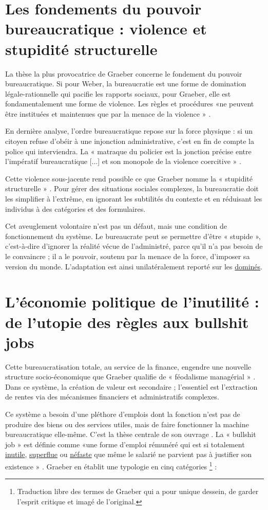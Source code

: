\section{Les fondements du pouvoir bureaucratique : violence et stupidité structurelle}

La thèse la plus provocatrice de Graeber concerne le fondement du pouvoir bureaucratique. Si pour Weber, la bureaucratie est une forme de domination légale-rationnelle qui pacifie les rapports sociaux, pour Graeber, elle est fondamentalement une forme de violence. Les règles et procédures «ne peuvent être instituées et maintenues que par la menace de la violence » .

En dernière analyse, l'ordre bureaucratique repose sur la force physique : si un citoyen refuse d'obéir à une injonction administrative, c'est en fin de compte la police qui interviendra. La « matraque du policier est la jonction précise entre l'impératif bureaucratique [...] et son monopole de la violence coercitive » .

Cette violence sous-jacente rend possible ce que Graeber nomme la « stupidité structurelle » \citet{Graeber2015} . Pour gérer des situations sociales complexes, la bureaucratie doit les simplifier à l'extrême, en ignorant les subtilités du contexte et en réduisant les individus à des catégories et des formulaires.

Cet aveuglement volontaire n'est pas un défaut, mais une condition de fonctionnement du système. Le bureaucrate peut se permettre d'être « stupide », c'est-à-dire d'ignorer la réalité vécue de l'administré, parce qu'il n'a pas besoin de le convaincre ; il a le pouvoir, soutenu par la menace de la force, d'imposer sa version du monde. L'adaptation est ainsi unilatéralement reporté sur les \underline{dominés}.

\section{L'économie politique de l'inutilité : de l'utopie des règles aux bullshit jobs}

Cette bureaucratisation totale, au service de la finance, engendre une nouvelle structure socio-économique que Graeber qualifie de « féodalisme managérial » \citet{Graeber2018} . Dans ce système, la création de valeur est secondaire ; l'essentiel est l'extraction de rentes via des mécanismes financiers et administratifs complexes.

Ce système a besoin d'une pléthore d'emplois dont la fonction n'est pas de produire des biens ou des services utiles, mais de faire fonctionner la machine bureaucratique elle-même. C'est la thèse centrale de son ouvrage \citep{Graeber2018}. La « bullshit job »  est définie comme «une forme d’emploi rémunéré qui est si totalement \underline{inutile}, \underline{superflue} ou \underline{néfaste} que même le salarié ne parvient pas à justifier son existence » . Graeber en établit une typologie en cinq catégories \footnote{Traduction libre des termes de Graeber qui a pour unique dessein, de garder l’esprit critique et imagé de l’original.} : 

